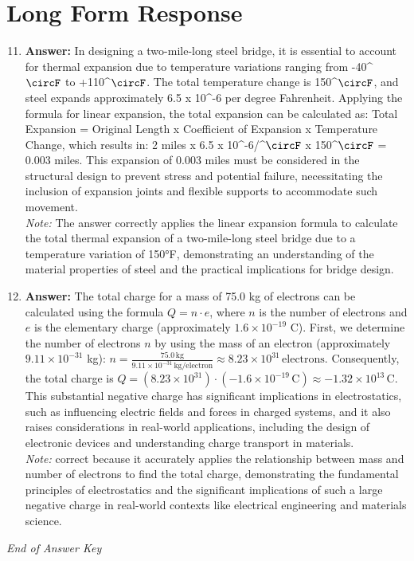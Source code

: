 \documentclass[12pt]{article}
\begin{document}
\section*{Long Form Response}
\begin{enumerate}[label=\arabic*.]
\setcounter{enumi}{10}
\item \textbf{Answer:} In designing a two-mile-long steel bridge, it is essential to account for thermal expansion due to temperature variations ranging from -40^\ensuremath{\circF} to +110^\ensuremath{\circF}. The total temperature change is 150^\ensuremath{\circF}, and steel expands approximately 6.5 x 10^-6 per degree Fahrenheit. Applying the formula for linear expansion, the total expansion can be calculated as: Total Expansion = Original Length x Coefficient of Expansion x Temperature Change, which results in: 2 miles x 6.5 x 10^-6/^\ensuremath{\circF} x 150^\ensuremath{\circF} = 0.003 miles. This expansion of 0.003 miles must be considered in the structural design to prevent stress and potential failure, necessitating the inclusion of expansion joints and flexible supports to accommodate such movement.
\\ \textit{Note:} The answer correctly applies the linear expansion formula to calculate the total thermal expansion of a two-mile-long steel bridge due to a temperature variation of 150°F, demonstrating an understanding of the material properties of steel and the practical implications for bridge design.
\item \textbf{Answer:} The total charge for a mass of 75.0 kg of electrons can be calculated using the formula \( Q = n \cdot e \), where \( n \) is the number of electrons and \( e \) is the elementary charge (approximately \( 1.6 \times 10^{-19} \) C). First, we determine the number of electrons \( n \) by using the mass of an electron (approximately \( 9.11 \times 10^{-31} \) kg): \( n = \frac{75.0 \, \text{kg}}{9.11 \times 10^{-31} \, \text{kg/electron}} \approx 8.23 \times 10^{31} \, \text{electrons} \). Consequently, the total charge is \( Q = (8.23 \times 10^{31}) \cdot (-1.6 \times 10^{-19} \, \text{C}) \approx -1.32 \times 10^{13} \, \text{C} \). This substantial negative charge has significant implications in electrostatics, such as influencing electric fields and forces in charged systems, and it also raises considerations in real-world applications, including the design of electronic devices and understanding charge transport in materials.
\\ \textit{Note:} correct because it accurately applies the relationship between mass and number of electrons to find the total charge, demonstrating the fundamental principles of electrostatics and the significant implications of such a large negative charge in real-world contexts like electrical engineering and materials science.
\end{enumerate}

\vfill
\noindent\textit{End of Answer Key}
\end{document}
